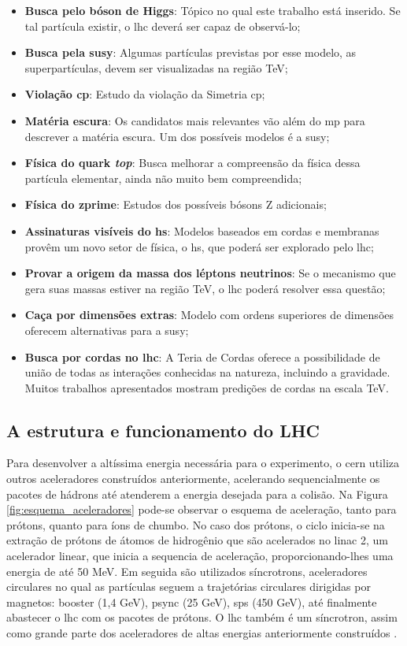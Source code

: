\begin{itemize}
\item \textbf{Busca pelo bóson de Higgs}: Tópico no qual este trabalho está
inserido. Se tal partícula existir, o \gls{lhc} deverá ser capaz de observá-lo;
\item \textbf{Busca pela \gls{susy}}: Algumas partículas previstas por esse
modelo, as superpartículas, 
devem ser visualizadas na região TeV;
\item \textbf{Violação \gls{cp}}: Estudo da violação da Simetria \gls{cp};
\item \textbf{Matéria escura}: Os candidatos mais relevantes vão além do \gls{mp}
para descrever a matéria escura. Um dos possíveis modelos é a \gls{susy};
\item \textbf{Física do quark \emph{top}}: Busca melhorar a compreensão da física dessa
partícula elementar, ainda não muito bem compreendida;
\item \textbf{Física do \gls{zprime}}: Estudos dos possíveis bósons Z adicionais; 
\item \textbf{Assinaturas visíveis do \gls{hs}}: Modelos baseados em
cordas e membranas provêm um novo setor de física, o \gls{hs}, que poderá ser
explorado pelo \gls{lhc};
\item \textbf{Provar a origem da massa dos léptons neutrinos}: Se o mecanismo que gera
suas massas estiver na região TeV, o \gls{lhc} poderá resolver essa questão;
\item \textbf{Caça por dimensões extras}: Modelo com ordens superiores de dimensões
oferecem alternativas para a \gls{susy};
\item \textbf{Busca por cordas no \gls{lhc}}: A Teria de Cordas oferece a possibilidade de
união de todas as interações conhecidas na natureza, incluindo a gravidade. Muitos
trabalhos apresentados mostram predições de cordas na escala TeV.
\end{itemize}

\subsection{A estrutura e funcionamento do LHC}
\label{ssec:struct_lhc}

Para desenvolver a altíssima energia necessária para o experimento, o \gls{cern}
utiliza outros aceleradores construídos anteriormente, acelerando
sequencialmente os pacotes de hádrons até atenderem
a energia desejada para a colisão. Na Figura \ref{fig:esquema_aceleradores} pode-se observar
o esquema de aceleração, tanto para prótons, quanto para íons de chumbo. 
No caso dos prótons, o ciclo inicia-se na extração de prótons de átomos
de hidrogênio que são acelerados no \acrshort{linac} 2, um acelerador linear,
que inicia a sequencia de aceleração, proporcionando-lhes uma energia de até 50 MeV. 
Em seguida são utilizados síncrotrons, aceleradores circulares no qual as
partículas seguem a trajetórias circulares dirigidas por magnetos: \acrshort{booster} (1,4
GeV), \acrshort{psync} (25 GeV), \acrshort{sps} (450 GeV), até finalmente 
abastecer o \gls{lhc} com os pacotes de prótons. O \gls{lhc} também é um
síncrotron, assim como grande parte dos aceleradores de altas energias anteriormente 
construídos \cite{lecture_slides_1,lecture_slides_2}.

